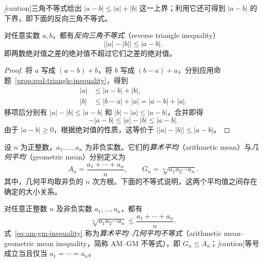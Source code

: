 \documentclass[UTF8,12pt,a4paper,fontset=fandol]{ctexbook}
\begin{document}
\emph[caution]{三角不等式给出 $|a-b|\leq |a|+|b|$ 这一上界；利用它还可得到 $|a-b|$ 的下界，即下面的反向三角不等式。}

\begin{corollary}[反向三角不等式]
\label{cor:real-reverse-triangle-inequality}
对任意实数 $a,b$，都有\emph{反向三角不等式}（reverse triangle inequality）
\begin{equation}
    \bigl||a|-|b|\bigr|\leq |a-b|.
    \label{eq:real-reverse-triangle-inequality}
\end{equation}
即两数绝对值之差的绝对值不超过它们之差的绝对值。
\end{corollary}

\begin{proof}
将 $a$ 写成 $(a-b)+b$，将 $b$ 写成 $(b-a)+a$，分别应用命题~\ref{prop:real-triangle-inequality}，得到
\[
    \begin{aligned}
        |a|&\leq |a-b|+|b|,\\
        |b|&\leq |b-a|+|a|=|a-b|+|a|.
    \end{aligned}
\]
移项后分别有 $|a|-|b|\leq |a-b|$ 和 $|b|-|a|\leq |a-b|$，合并即得
\[
    -|a-b|\leq |a|-|b|\leq |a-b|.
\]
由于 $|a-b|\geq 0$，根据绝对值的性质，这等价于 $\bigl||a|-|b|\bigr|\leq |a-b|$。
\end{proof}

\begin{definition}
\label{def:arithmetic-and-geometric-means}
设 $n$ 为正整数，$a_1,\ldots,a_n$ 为非负实数。它们的\emph{算术平均}（arithmetic mean）与\emph{几何平均}（geometric mean）分别定义为
\[
    A_n=\frac{a_1+\cdots+a_n}{n},
    \qquad
    G_n=\sqrt[n]{a_1a_2\cdots a_n}.
\]
其中，几何平均取非负的 $n$ 次方根。下面的不等式说明，这两个平均值之间存在确定的大小关系。
\end{definition}

\begin{proposition}
\label{prop:am-gm-inequality}
对任意正整数 $n$ 及非负实数 $a_1,\ldots,a_n$，都有
\begin{equation}
    \sqrt[n]{a_1a_2\cdots a_n}
    \leq \frac{a_1+\cdots+a_n}{n}.
    \label{eq:am-gm-inequality}
\end{equation}
式~\eqref{eq:am-gm-inequality} 称为\emph{算术平均--几何平均不等式}（arithmetic mean--geometric mean inequality，简称 AM--GM 不等式），即 $G_n\leq A_n$；\emph[caution]{等号成立当且仅当 $a_1=\cdots=a_n$。}
\end{proposition}
\end{document}
